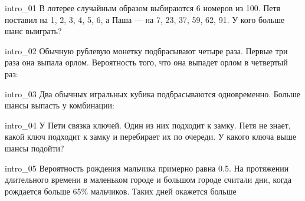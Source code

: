 \documentclass{article}
\begin{document}


\begin{question}{intro_01}
В лотерее случайным образом выбираются 6 номеров из 100. Петя поставил на 1, 2, 3, 4, 5, 6, а Паша --- на 7, 23, 37, 59, 62, 91. У кого больше шанс выиграть?
  \begin{choiceshoriz}
  \end{choiceshoriz}
\end{question}


\begin{question}{intro_02}
Обычную рублевую монетку подбрасывают четыре раза. Первые три раза она выпала орлом. Вероятность того, что она выпадет орлом в четвертый раз:
  \begin{choiceshoriz}
  \end{choiceshoriz}
\end{question}


\begin{question}{intro_03}
Два обычных игральных кубика подбрасываются одновременно. Больше шансы выпасть у комбинации:
  \begin{choiceshoriz}[o]
  \end{choiceshoriz}
\end{question}


\begin{question}{intro_04}
У Пети связка ключей. Один из них подходит к замку. Петя не знает, какой ключ подходит к замку и перебирает их по очереди. У какого ключа выше шансы подойти?
  \begin{choiceshoriz}[o]
  \end{choiceshoriz}
\end{question}

\begin{question}{intro_05}
Вероятность рождения мальчика примерно равна 0.5. На протяжении длительного времени в маленьком городе и большом городе считали дни, когда рождается больше 65\% мальчиков. Таких дней окажется больше
  \begin{choiceshoriz}
  \end{choiceshoriz}
\end{question}
\end{document}
